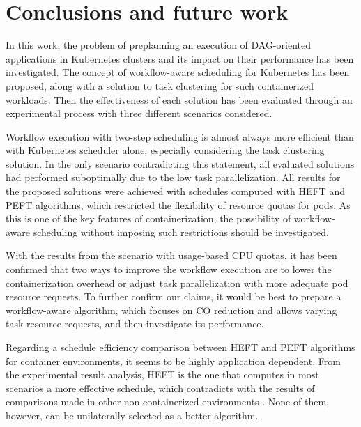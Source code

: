 \thispagestyle{only-cfoot}
\section{Conclusions and future work}\label{s:Conclusions}




In this work, the problem of preplanning an execution of DAG-oriented applications in Kubernetes clusters and its impact on their performance has been investigated.
The concept of workflow-aware scheduling for Kubernetes has been proposed, along with a solution to task clustering for such containerized workloads.
Then the effectiveness of each solution has been evaluated through an experimental process with three different scenarios considered.



Workflow execution with two-step scheduling is almost always more efficient than with Kubernetes scheduler alone, especially considering the task clustering solution. 
In the only scenario contradicting this statement, all evaluated solutions had performed suboptimally due to the low task parallelization.
All results for the proposed solutions were achieved with schedules computed with HEFT and PEFT algorithms, which restricted the flexibility of resource quotas for pods.
As this is one of the key features of containerization, the possibility of workflow-aware scheduling without imposing such restrictions should be investigated.


With the results from the scenario with usage-based CPU quotas, it has been confirmed that two ways to improve the workflow execution are to lower the containerization overhead or adjust task parallelization with more adequate pod resource requests.
To further confirm our claims, it would be best to prepare a workflow-aware algorithm, which focuses on CO reduction and allows varying task resource requests, and then investigate its performance.


Regarding a schedule efficiency comparison between HEFT and PEFT algorithms for container environments, it seems to be highly application dependent.
From the experimental result analysis, HEFT is the one that computes in most scenarios a more effective schedule, which contradicts with the results of comparisons made in other non-containerized environments \cite{b:Performance-Comparison-Scheduling-DAG, b:Performance-Analysis-Scheduling-DAG}.
None of them, however, can be unilaterally selected as a better algorithm.

